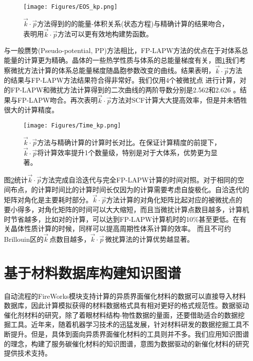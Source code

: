 \begin{figure}[h!]
\centering
\texttt{[image: Figures/EOS\_kp.png]}
\caption{{$\vec k\cdot\vec p$方法得到的的能量-体积关系(状态方程)与精确计算的结果吻合，表明用$\vec k\cdot\vec p$方法可以更有效地构建势函数。}}%
\label{EOS_kp}
\end{figure}
与一般赝势\textrm{(Pseudo-potential, PP)}方法相比，\textrm{FP-LAPW}方法的优点在于对体系总能量的计算更为精确。晶体的一些热学性质与体系的总能量梯度有关，图\ref{EOS_kp}我们考察微扰方法计算的体系总能量梯度随晶胞参数改变的曲线。结果表明，$\vec k\cdot\vec p$方法的结果与\textrm{FP-LAPW}方法结果符合得非常好。我们仅用4个被微扰点%
进行计算，对的\textrm{FP-LAPW}和微扰方法计算得到的二次曲线的两阶导数分别是2.562和2.626%
。结果与\textrm{FP-LAPW}吻合。再次表明$\vec k\cdot\vec p$方法对SCF计算大大提高效率，但是并未牺牲很大的计算精度。

\begin{figure}[h!]
\centering
\texttt{[image: Figures/Time\_kp.png]}
\caption{{$\vec k\cdot\vec p$方法与精确计算的计算时长对比。在保证计算精度的前提下，$\vec k\cdot\vec p$将计算效率提升1个数量级，特别是对于大体系，优势更为显著。}}%
\label{Time_kp}
\end{figure}
图\ref{Time_kp}统计$\vec k\cdot\vec p$方法完成自洽迭代与完全FP-LAPW计算的时间对照。对于相同的空间布点，的计算时间比的计算时间长仅因为的计算需要考虑自旋极化。自洽迭代的矩阵对角化是主要耗时部分。$\vec k\cdot\vec p$方法计算的对角化矩阵比起对应的被微扰点的要小得多，对角化矩阵的时间可以大大缩短，而且当微扰计算点数目越多，计算机时节省越多，比如对的计算，可以达到\textrm{FP-LAPW}计算机时的10\%甚至更低。在有关晶体性质计算的时候，同样可以提高周期性体系计算的效率。
而且不可约\textrm{Brillouin}区的$\vec k$\,点数目越多，$\vec k\cdot\vec p$\,微扰算法的计算优势越显著。

\section{基于材料数据库构建知识图谱}
自动流程的\textrm{FireWorks}模块支持计算的异质界面催化材料的数据可以直接导入材料数据库，因此计算模拟获得的材料数据格式具有相对更好的格式规范性。数据驱动催化剂材料的研究，除了着眼材料结构-物性数据的量面，还要借助适合的数据挖掘工具。近年来，随着机器学习技术的迅猛发展，针对材料研发的数据挖掘工具不断提升。但是，具体到面向异质界面催化材料的工具则并不多。我们应用知识图谱的理念，构建了服务碳催化材料的知识图谱，意图为数据驱动的新催化材料的研究提供技术支持。

